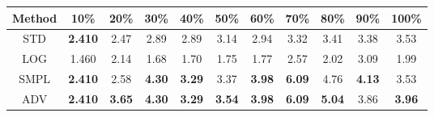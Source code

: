 \documentclass{standalone}
\begin{document}
\begin{tabular}{c|cccccccccc}
      \toprule
      Method & 10\% & 20\% & 30\% & 40\% & 50\% & 60\% & 70\% & 80\% & 90\% & 100\% \\
      \midrule
STD & \textbf{2.410} & 2.47 & 2.89 & 2.89 & 3.14 & 2.94 & 3.32 & 3.41 & 3.38 & 3.53\\
LOG & 1.460 & 2.14 & 1.68 & 1.70 & 1.75 & 1.77 & 2.57 & 2.02 & 3.09 & 1.99\\
SMPL & \textbf{2.410} & 2.58 & \textbf{4.30} & \textbf{3.29} & 3.37 & \textbf{3.98} & \textbf{6.09} & 4.76 & \textbf{4.13} & 3.53\\
ADV & \textbf{2.410} & \textbf{3.65} & \textbf{4.30} & \textbf{3.29} & \textbf{3.54} & \textbf{3.98} & \textbf{6.09} & \textbf{5.04} & 3.86 & \textbf{3.96}\\
  \bottomrule
\end{tabular}
\end{document}
